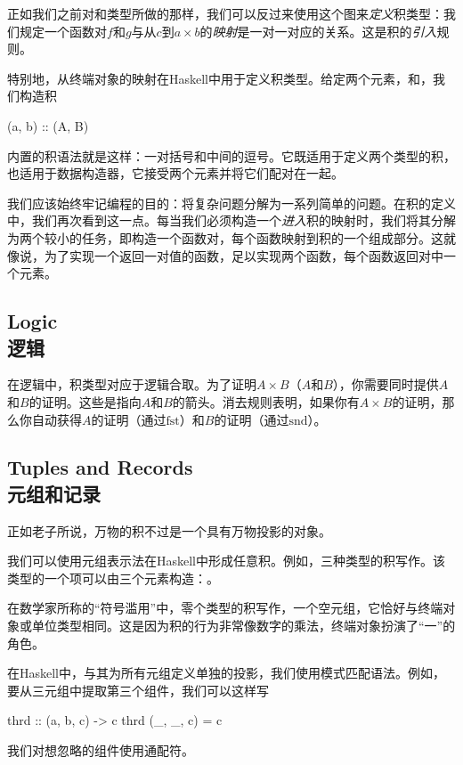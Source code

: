\documentclass[DaoFP]{subfiles}
\begin{document}
 正如我们之前对和类型所做的那样，我们可以反过来使用这个图来\emph{定义}积类型：我们规定一个函数对$f$和$g$与从$c$到$a \times b$的\emph{映射}是一对一对应的关系。这是积的\emph{引入}规则。

 特别地，从终端对象的映射在Haskell中用于定义积类型。给定两个元素，和，我们构造积

 \begin{haskell}
 (a, b) :: (A, B)
 \end{haskell}
 内置的积语法就是这样：一对括号和中间的逗号。它既适用于定义两个类型的积，也适用于数据构造器，它接受两个元素并将它们配对在一起。

 我们应该始终牢记编程的目的：将复杂问题分解为一系列简单的问题。在积的定义中，我们再次看到这一点。每当我们必须构造一个\emph{进入}积的映射时，我们将其分解为两个较小的任务，即构造一个函数对，每个函数映射到积的一个组成部分。这就像说，为了实现一个返回一对值的函数，足以实现两个函数，每个函数返回对中一个元素。

 \subsection{Logic\\逻辑}

 在逻辑中，积类型对应于逻辑合取。为了证明$A \times B$（$A$和$B$），你需要同时提供$A$和$B$的证明。这些是指向$A$和$B$的箭头。消去规则表明，如果你有$A \times B$的证明，那么你自动获得$A$的证明（通过$\text{fst}$）和$B$的证明（通过$\text{snd}$）。

 \subsection{Tuples and Records\\元组和记录}

 正如老子所说，万物的积不过是一个具有万物投影的对象。

 我们可以使用元组表示法在Haskell中形成任意积。例如，三种类型的积写作。该类型的一个项可以由三个元素构造：。

 在数学家所称的“符号滥用”中，零个类型的积写作\hask{()}，一个空元组，它恰好与终端对象或单位类型相同。这是因为积的行为非常像数字的乘法，终端对象扮演了“一”的角色。

 在Haskell中，与其为所有元组定义单独的投影，我们使用模式匹配语法。例如，要从三元组中提取第三个组件，我们可以这样写

 \begin{haskell}
  thrd :: (a, b, c) -> c
  thrd (_, _, c) = c
 \end{haskell}
 我们对想忽略的组件使用通配符。
\end{document}
